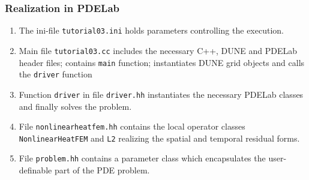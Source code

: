 \documentclass[aspectratio=169,11pt]{beamer}
\theoremstyle{definition}
\begin{document}
\begin{frame}
\frametitle{Realization in PDELab}
\begin{enumerate}[1)]
\item The ini-file
\lstinline{tutorial03.ini} holds parameters
controlling the execution.
\item Main file \lstinline{tutorial03.cc} includes the necessary C++,
DUNE and PDELab header files;
contains \lstinline{main} function;
instantiates DUNE grid objects and calls the \lstinline{driver} function
\item Function \lstinline{driver} in file \lstinline{driver.hh} instantiates
the necessary PDELab classes and finally solves the problem.
\item File \lstinline{nonlinearheatfem.hh} contains the local operator classes
\lstinline{NonlinearHeatFEM} and \lstinline{L2} realizing the spatial
and temporal residual forms.
\item File \lstinline{problem.hh} contains a parameter class which
encapsulates the user-definable part of the PDE problem.
\end{enumerate}
\end{frame}
\end{document}
